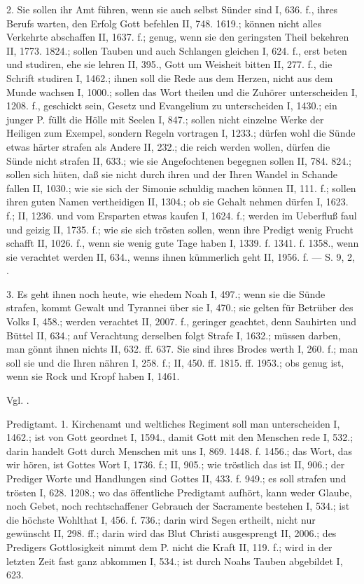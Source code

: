 2.  Sie sollen ihr Amt führen, wenn sie auch selbst Sünder sind I, 636. f., ihres Berufs warten, den Erfolg Gott befehlen II, 748. 1619.; können nicht alles Verkehrte abschaffen II, 1637. f.; genug, wenn sie den geringsten Theil bekehren II, 1773. 1824.; sollen Tauben und auch Schlangen gleichen I, 624. f., erst beten und studiren, ehe sie lehren II, 395., Gott um Weisheit bitten II, 277. f., die Schrift studiren I, 1462.; ihnen soll die Rede aus dem Herzen, nicht aus dem Munde wachsen I, 1000.; sollen das Wort theilen und die Zuhörer unterscheiden I, 1208. f., geschickt sein, Gesetz und Evangelium zu unterscheiden I, 1430.; ein junger P. füllt die Hölle mit Seelen I, 847.; sollen nicht einzelne Werke der Heiligen zum Exempel, sondern Regeln vortragen I, 1233.; dürfen wohl die Sünde etwas härter strafen als Andere II, 232.; die reich werden wollen, dürfen die Sünde nicht strafen II, 633.; wie sie Angefochtenen begegnen sollen II, 784. 824.; sollen sich hüten, daß sie nicht durch ihren und der Ihren Wandel in Schande fallen II, 1030.; wie sie sich der Simonie schuldig machen können II, 111. f.; sollen ihren guten Namen vertheidigen II, 1304.; ob sie Gehalt nehmen dürfen I, 1623. f.; II, 1236. und vom Ersparten etwas kaufen I, 1624. f.; werden im Ueberfluß faul und geizig II, 1735. f.; wie sie sich trösten sollen, wenn ihre Predigt wenig Frucht schafft II, 1026. f., wenn sie wenig gute Tage haben I, 1339. f. 1341. f. 1358., wenn sie verachtet werden II, 634., wenns ihnen kümmerlich geht II, 1956. f. — S.  9,  2, .

3.  Es geht ihnen noch heute, wie ehedem Noah I, 497.; wenn sie die Sünde strafen, kommt Gewalt und Tyrannei über sie I, 470.; sie gelten für Betrüber des Volks I, 458.; werden verachtet II, 2007. f., geringer geachtet, denn Sauhirten und Büttel II, 634.; auf Verachtung derselben folgt Strafe I, 1632.; müssen darben, man gönnt ihnen nichts II, 632. ff. 637. Sie sind ihres Brodes werth I, 260. f.; man soll sie und die Ihren nähren I, 258. f.; II, 450. ff. 1815. ff. 1953.; obs genug ist, wenn sie Rock und Kropf haben I, 1461.

Vgl. .

Predigtamt. 1.  Kirchenamt und weltliches Regiment soll man unterscheiden I, 1462.; ist von Gott geordnet I, 1594., damit Gott mit den Menschen rede I, 532.; darin handelt Gott durch Menschen mit uns I, 869. 1448. f. 1456.; das Wort, das wir hören, ist Gottes Wort I, 1736. f.; II, 905.; wie tröstlich das ist II, 906.; der Prediger Worte und Handlungen sind Gottes II, 433. f. 949.; es soll strafen und trösten I, 628. 1208.; wo das öffentliche Predigtamt aufhört, kann weder Glaube, noch Gebet, noch rechtschaffener Gebrauch der Sacramente bestehen I, 534.; ist die höchste Wohlthat I, 456. f. 736.; darin wird Segen ertheilt, nicht nur gewünscht II, 298. ff.; darin wird das Blut Christi ausgesprengt II, 2006.; des Predigers Gottlosigkeit nimmt dem P. nicht die Kraft II, 119. f.; wird in der letzten Zeit fast ganz abkommen I, 534.; ist durch Noahs Tauben abgebildet I, 623.

